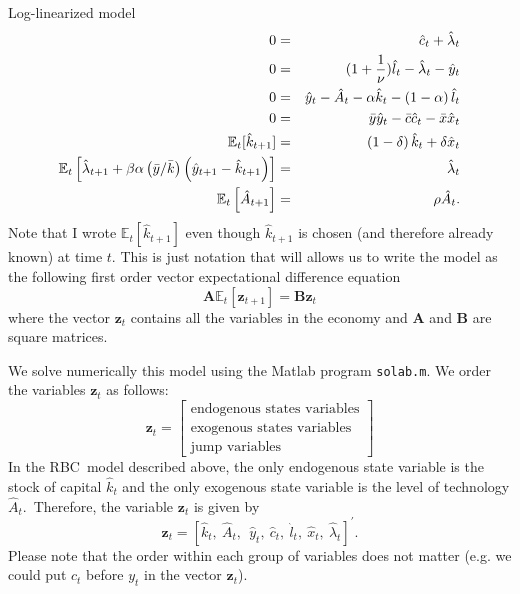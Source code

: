 \documentclass[12pt]{article}
\begin{document}
Log-linearized model%
\begin{eqnarray}
0 &=&\hat{c}_{t}+\hat{\lambda}_{t}  \label{lin eq1} \\
0 &=&(1+\frac{1}{\nu })\hat{l}_{t}-\hat{\lambda}_{t}-\hat{y}_{t}
\label{lin eq2} \\
0 &=&\hat{y}_{t}-\hat{A}_{t}-\alpha \hat{k}_{t}-\left( 1-\alpha \right) \hat{%
l}_{t}  \label{lin eq3} \\
0 &=&\bar{y}\hat{y}_{t}-\bar{c}\hat{c}_{t}-\bar{x}\hat{x}_{t}
\label{lin eq4} \\
\mathbb{E}_{t}[\hat{k}_{t+1}] &=&\left( 1-\delta \right) \hat{k}_{t}+\delta 
\hat{x}_{t}  \label{lin eq5} \\
\mathbb{E}_{t}\left[ \hat{\lambda}_{t+1}+\beta \alpha \left( \bar{y}/\bar{k}%
\right) \left( \hat{y}_{t+1}-\hat{k}_{t+1}\right) \right]  &=&\hat{\lambda}%
_{t}  \label{lin eq6} \\
\mathbb{E}_{t}\left[ \hat{A}_{t+1}\right]  &=&\rho \hat{A}_{t}.
\label{lin eq7}
\end{eqnarray}%
Note that I wrote $\mathbb{E}_{t}[\hat{k}_{t+1}]$ even though $\hat{k}_{t+1}$
is chosen (and therefore already known) at time $t$. This is just notation
that will allows us to write the model as the following first order vector
expectational difference equation%
\begin{equation}
\mathbf{A}\mathbb{E}_{t}\left[ \mathbf{z}_{t+1}\right] =\mathbf{Bz}_{t}
\label{Linear Diff Eqn}
\end{equation}%
where the vector $\mathbf{z}_{t}$ contains all the variables in the economy
and $\mathbf{A}$ and $\mathbf{B}$ are square matrices.

We solve numerically this model using the Matlab program \texttt{solab.m}.
We order the variables $\mathbf{z}_{t}$ as follows:%
\begin{equation*}
\mathbf{z}_{t}=\left[ 
\begin{array}{c}
\text{endogenous states variables} \\ 
\text{exogenous states variables} \\ 
\text{jump variables}%
\end{array}%
\right]
\end{equation*}%
In the RBC\ model described above, the only endogenous state variable is the
stock of capital $\hat{k}_{t}$ and the only exogenous state variable is the
level of technology $\hat{A}_{t}$.\ Therefore, the variable $\mathbf{z}_{t}$
is given by%
\begin{equation}
\mathbf{z}_{t}=\left[ \hat{k}_{t},\ \hat{A}_{t},\ \ \hat{y}_{t},\ \hat{c}%
_{t},\ \hat{l}_{t},\ \hat{x}_{t},\ \hat{\lambda}_{t}\right] ^{\prime }.
\label{ordering z}
\end{equation}%
Please note that the order within each group of variables does not matter
(e.g. we could put $c_{t}$ before $y_{t}$ in the vector $\mathbf{z}_{t}$).
\end{document}
